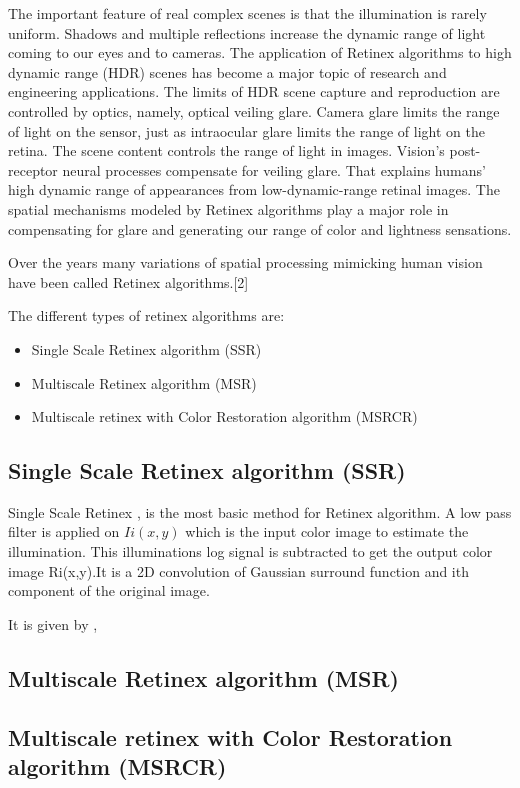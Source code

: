 The important feature of real complex scenes is that the illumination is rarely uniform. Shadows and multiple reflections increase the dynamic range of light coming to our eyes and to cameras. The application of Retinex algorithms to high dynamic range (HDR) scenes has become a major topic of research and engineering applications. The limits of HDR scene capture and reproduction are controlled by optics, namely, optical veiling glare. Camera glare limits the range of light on the sensor, just as intraocular glare limits the range of light on the retina. The scene content controls the range of light in images. Vision’s post-receptor neural processes compensate for veiling glare. That explains humans’ high dynamic range of appearances from low-dynamic-range retinal images. The spatial mechanisms modeled by Retinex algorithms play a major role in compensating for glare and generating our range of color and lightness sensations.

Over the years many variations of spatial processing mimicking human vision have been called Retinex algorithms.[2]

The different types of retinex algorithms are: 
\begin{itemize}
		\item Single Scale Retinex algorithm (SSR)
		\item Multiscale Retinex algorithm (MSR)
		\item Multiscale retinex with Color Restoration algorithm (MSRCR) 
\end{itemize}
	
\subsection{Single Scale Retinex algorithm (SSR)}
Single Scale Retinex , is the most basic method for Retinex algorithm. A low pass filter is applied on $Ii (x, y)$ which is the input color image to estimate the illumination. This illuminations log signal is subtracted to get the output color image Ri(x,y).It is a 2D convolution of Gaussian surround function and ith component of the original image.

It is given by , 





\subsection{Multiscale Retinex algorithm (MSR)}
\subsection{Multiscale retinex with Color Restoration algorithm (MSRCR)}
